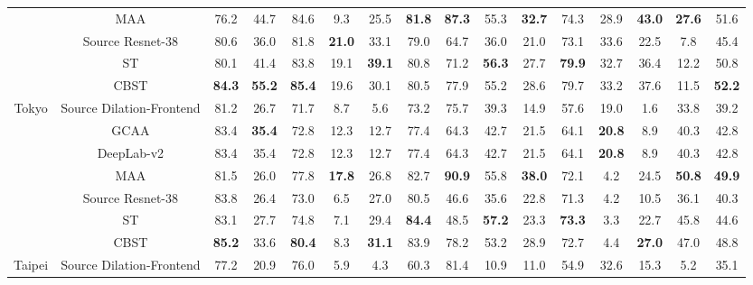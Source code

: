 \documentclass[runningheads]{llncs}
\begin{document}
\begin{table*}[!t]
{\begin{tabular}{c|c|ccccccccccccc|c}
& MAA \cite{tsai2018learning}     & 76.2 & 44.7 & 84.6 & 9.3 & 25.5 & \textbf{81.8} & \textbf{87.3} & 55.3 & \textbf{32.7} & 74.3 & 28.9 & \textbf{43.0} & \textbf{27.6} & 51.6 \\  \cline{2-16}
                        & Source Resnet-38 & 80.6 & 36.0 & 81.8  & \textbf{21.0} & 33.1 & 79.0 & 64.7 & 36.0 & 21.0  & 73.1 & 33.6 & 22.5  & 7.8  & 45.4 \\
                        & ST               & 80.1 & 41.4 & 83.8  & 19.1 & \textbf{39.1} & 80.8 & 71.2 & \textbf{56.3} & 27.7  & \textbf{79.9} & 32.7 & 36.4  & 12.2 & 50.8 \\
                        & CBST             & \textbf{84.3} & \textbf{55.2} & \textbf{85.4} & 19.6 & 30.1 & 80.5 & 77.9 & 55.2 & 28.6 & 79.7 & 33.2 & 37.6 & 11.5 & \textbf{52.2} \\ \hline
\multirow{5}{*}{Tokyo}  & Source Dilation-Frontend \cite{Chen_2017_ICCV}     & 81.2 & 26.7 & 71.7  & 8.7  & 5.6  & 73.2 & 75.7 & 39.3 & 14.9  & 57.6 & 19.0 & 1.6   & 33.8 & 39.2 \\
                        & GCAA \cite{Chen_2017_ICCV}            & 83.4 & \textbf{35.4} & 72.8  & 12.3 & 12.7 & 77.4 & 64.3 & 42.7 & 21.5  & 64.1 & \textbf{20.8} & 8.9   & 40.3 & 42.8 \\ \cline{2-16}
                        & DeepLab-v2 \cite{tsai2018learning} & 83.4 & 35.4 & 72.8 & 12.3 & 12.7 & 77.4 & 64.3 & 42.7 & 21.5 & 64.1 & \textbf{20.8} & 8.9 & 40.3 & 42.8 \\
& MAA \cite{tsai2018learning}     &  81.5 & 26.0 & 77.8 & \textbf{17.8} & 26.8 & 82.7 & \textbf{90.9} & 55.8 & \textbf{38.0} & 72.1 & 4.2 & 24.5 & \textbf{50.8} & \textbf{49.9} \\  \cline{2-16}
                        & Source Resnet-38 & 83.8 & 26.4 & 73.0  & 6.5  & 27.0 & 80.5 & 46.6 & 35.6 & 22.8  & 71.3 & 4.2  & 10.5  & 36.1 & 40.3 \\
                        & ST               & 83.1 & 27.7 & 74.8  & 7.1  & 29.4 & \textbf{84.4} & 48.5 & \textbf{57.2} & 23.3  & \textbf{73.3} & 3.3  & 22.7  & 45.8 & 44.6 \\
                        & CBST             & \textbf{85.2} & 33.6 & \textbf{80.4} & 8.3 & \textbf{31.1} & 83.9 & 78.2 & 53.2 & 28.9 & 72.7 & 4.4 & \textbf{27.0} & 47.0 & 48.8 \\ \hline
\multirow{5}{*}{Taipei} & Source Dilation-Frontend \cite{Chen_2017_ICCV}     & 77.2 & 20.9 & 76.0  & 5.9  & 4.3  & 60.3 & 81.4 & 10.9 & 11.0  & 54.9 & 32.6 & 15.3  & 5.2  & 35.1 \\

\end{tabular}}
\end{table*}
\end{document}

